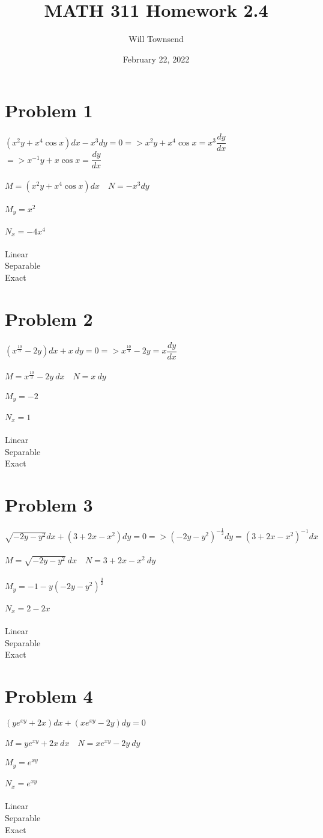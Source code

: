 \documentclass[12pt]{exam}
\title{\textbf{MATH 311 Homework 2.4}}
\author{Will Townsend}
\date{February 22, 2022}
\begin{document}
\maketitle

\section*{Problem 1}
$(x^2y+x^4\cos{x})dx-x^3dy=0=>x^2y+x^4\cos{x}=x^3\dfrac{dy}{dx}$
$=>x^{-1}y+x\cos{x}=\dfrac{dy}{dx}$\\\\
$M=(x^2y+x^4\cos{x})dx\quad N=-x^3dy$\\\\
$M_y=x^2$\\\\
$N_x=-4x^4$\\\\
Linear \checkmark\\
Separable\\
Exact
\section*{Problem 2}
$(x^{\frac{10}{3}}-2y)dx+x\:dy=0=>x^{\frac{10}{3}}-2y=x\dfrac{dy}{dx}$\\\\
$M=x^{\frac{10}{3}}-2y\:dx\quad N=x\:dy$\\\\
$M_y=-2$\\\\
$N_x=1$\\\\
Linear \checkmark\\
Separable\\
Exact
\section*{Problem 3}
$\sqrt{-2y-y^2}dx+(3+2x-x^2)dy=0=>(-2y-y^2)^{-\frac{1}{2}}dy=(3+2x-x^2)^{-1}dx$\\\\
$M=\sqrt{-2y-y^2}\:dx\quad N=3+2x-x^2\:dy$\\\\
$M_y=-1-y(-2y-y^2)^\frac{3}{2}$\\\\
$N_x=2-2x$\\\\
Linear\\
Separable \checkmark\\
Exact
\section*{Problem 4}
$(ye^{xy}+2x)dx+(xe^{xy}-2y)dy=0$\\\\
$M=ye^{xy}+2x\:dx\quad N=xe^{xy}-2y\:dy$\\\\
$M_y=e^{xy}$\\\\
$N_x=e^{xy}$\\\\
Linear \\
Separable\\
Exact \checkmark
\end{document}
